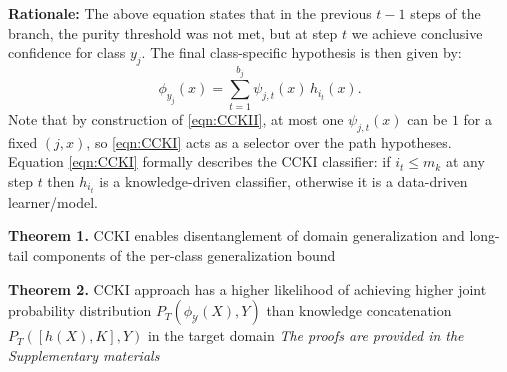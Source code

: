\documentclass[runningheads]{llncs}
\begin{document}
\noindent\textbf{Rationale:} The above equation states that in the previous $t-1$ steps of the branch, the purity threshold was not met, but at step $t$ we achieve conclusive confidence for class $y_j$. The final class-specific hypothesis is then given by:
{\scriptsize
\begin{equation}
\label{eqn:CCKI}
\phi_{y_j}(x) = \sum\limits_{t=1}^{b_j}{\psi_{j,t}(x)\,h_{i_t}(x)}.
\end{equation}
}
\noindent Note that by construction of \eqref{eqn:CCKII}, at most one $\psi_{j,t}(x)$ can be $1$ for a fixed $(j,x)$, so \eqref{eqn:CCKI} acts as a selector over the path hypotheses. Equation \eqref{eqn:CCKI} formally describes the CCKI classifier: if $i_t \le m_k$ at any step $t$ then $h_{i_t}$ is a knowledge-driven classifier, otherwise it is a data-driven learner/model.

\noindent\textbf{Theorem 1.}
CCKI enables disentanglement of domain generalization and long-tail components of the per-class generalization bound

\noindent\textbf{Theorem 2.}
CCKI approach has a higher likelihood of achieving higher joint probability distribution
$P_T(\phi_{\mathcal{Y}}(X),Y)$ than knowledge concatenation \\
$P_T([h(X),K],Y)$ in the target domain
\emph{The proofs are provided in the Supplementary materials}
 
\end{document}
